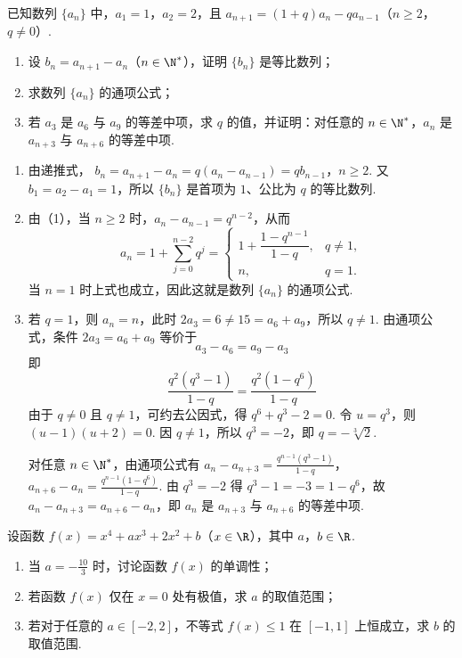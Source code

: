 \begin{problem}
已知数列 \(\{a_{n}\}\) 中，\(a_{1} = 1\)，\(a_{2} = 2\)，且 \(a_{n+1} = (1 + q)a_{n} - qa_{n-1}\)（\(n \geqslant 2\)，\(q \neq 0\)）.
\begin{enumerate}
\item 设 \( b_{n} = a_{n+1} - a_{n} \)（\(n \in \N^{*}\)），证明 \( \{b_{n}\} \) 是等比数列；
\item 求数列 \(\{a_{n}\}\) 的通项公式；
\item 若 \(a_{3}\) 是 \(a_{6}\) 与 \(a_{9}\) 的等差中项，求 \(q\) 的值，并证明：对任意的 \(n \in \N^{*}\)，\(a_{n}\) 是 \(a_{n + 3}\) 与 \(a_{n + 6}\) 的等差中项.
\end{enumerate}
\end{problem}

\begin{solution}
\begin{enumerate}
\item 由递推式，
\(b_n=a_{n+1}-a_n=q(a_n-a_{n-1})=qb_{n-1}\)，\(n\geqslant2\).
又 \(b_1=a_2-a_1=1\)，所以 \(\{b_n\}\) 是首项为 \(1\)、公比为 \(q\) 的等比数列.
\item 由（1），当 \(n\geqslant2\) 时，\(a_n-a_{n-1}=q^{n-2}\)，从而
\[
a_n=1+\sum_{j=0}^{n-2}q^j=
\begin{cases}
1+\dfrac{1-q^{n-1}}{1-q},&q\ne1,\\
n,&q=1.
\end{cases}
\]
当 \(n=1\) 时上式也成立，因此这就是数列 \(\{a_n\}\) 的通项公式.
\item 若 \(q=1\)，则 \(a_n=n\)，此时 \(2a_3=6\ne15=a_6+a_9\)，所以 \(q\ne1\). 由通项公式，条件 \(2a_3=a_6+a_9\) 等价于
\[
a_3-a_6=a_9-a_3
\]
即
\[
\frac{q^2(q^3-1)}{1-q}=\frac{q^2(1-q^6)}{1-q}
\]
由于 \(q\ne0\) 且 \(q\ne1\)，可约去公因式，得 \(q^6+q^3-2=0\). 令 \(u=q^3\)，则 \((u-1)(u+2)=0\). 因 \(q\ne1\)，所以 \(q^3=-2\)，即 \(q=-\sqrt[3]{2}\).

对任意 \(n\in\N^*\)，由通项公式有
\(a_n-a_{n+3}=\frac{q^{n-1}(q^3-1)}{1-q}\)，\(a_{n+6}-a_n=\frac{q^{n-1}(1-q^6)}{1-q}\).
由 \(q^3=-2\) 得 \(q^3-1=-3=1-q^6\)，故 \(a_n-a_{n+3}=a_{n+6}-a_n\)，即 \(a_n\) 是 \(a_{n+3}\) 与 \(a_{n+6}\) 的等差中项.
\end{enumerate}
\end{solution}

\begin{problem}
设函数 \( f(x) = x^4 + ax^3 + 2x^2 + b \)（\(x \in \R\)），其中 \(a\)，\(b \in \R\).
\begin{enumerate}
\item 当 \(a = -\frac{10}{3}\) 时，讨论函数 \(f(x)\) 的单调性；
\item 若函数 \( f(x) \) 仅在 \( x = 0 \) 处有极值，求 \( a \) 的取值范围；
\item 若对于任意的 \(a \in [-2, 2]\)，不等式 \(f(x) \leqslant 1\) 在 \([-1, 1]\) 上恒成立，求 \(b\) 的取值范围.
\end{enumerate}
\end{problem}

